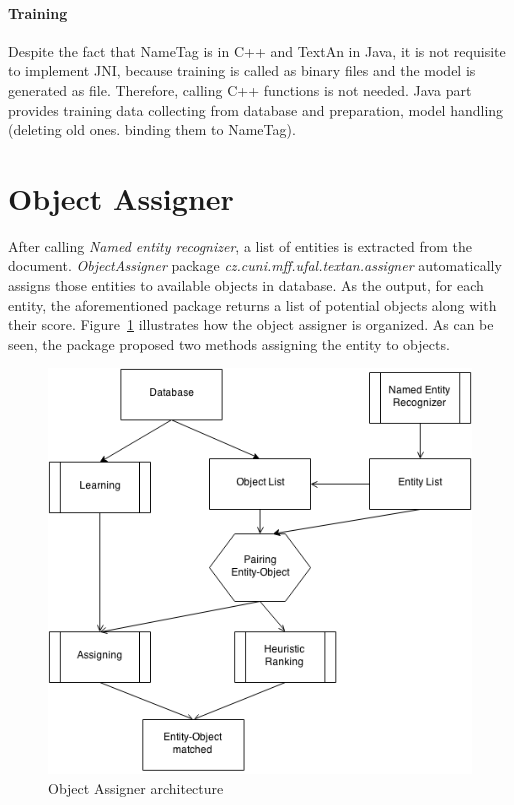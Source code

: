 \paragraph{Training}
Despite the fact that NameTag is in C++ and TextAn in Java, it is not requisite 
to implement JNI, because training is called as binary files and the model is generated
as file. Therefore, calling C++ functions is not needed. Java part provides
training data collecting from database and preparation, model handling
(deleting old ones. binding them to NameTag).

\section{Object Assigner}
\label{sec:ObjectAssigner}

After calling \emph{Named entity recognizer}, a list of entities is extracted from the document. \emph{ObjectAssigner}
package \emph{cz.cuni.mff.ufal.textan.assigner} automatically
assigns those entities to available objects in database. As the output, for 
each entity, the aforementioned package returns a list of potential objects along
with their score. Figure~\ref{fig:objectassigner} illustrates 
how the object assigner is organized. As can be seen, the package proposed 
two methods assigning the entity to objects.

\begin{figure}[!htb]
        \centering
        \includegraphics[width=\textwidth]{Images/assigner.png}
        \caption{Object Assigner architecture}
        \label{fig:objectassigner}
\end{figure}



